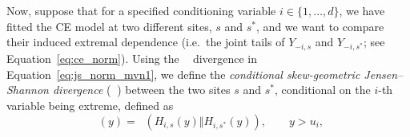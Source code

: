 \documentclass[12pt]{article}
\newcommand{\JSGa}{\mathop{\mathrm{JS}^{\mathrm{G}_{\lambda}}}\nolimits}
\newcommand{\cJSGa}[1]{\mathop{\mathrm{cJS}_{i, #1}^{\mathrm{G}_{\lambda}}}\nolimits}
\begin{document}
Now, suppose that for a specified conditioning variable $i \in \{1, \ldots, d\}$, we have fitted the CE model at two different sites, $s$ and $s^*$, and we want to compare their induced extremal dependence (i.e.\ the joint tails of $Y_{-i, s}$ and $Y_{-i, s^*}$; see Equation~\eqref{eq:ce_norm}). 
Using the $\JSGa{}$ divergence in Equation~\eqref{eq:js_norm_mvn1}, we define the \textit{conditional skew-geometric Jensen--Shannon divergence} ($\cJSGa{s, s^*}$) between the two sites $s$ and $s^*$, conditional on the $i$-th variable being extreme, defined as
\begin{equation} \label{eq:cjsga}
  \cJSGa{s, s^*}(y) = \JSGa{}\left(H_{i, s}(y) \Vert H_{i, s^*}(y)\right),\qquad y > u_i,
\end{equation}
\end{document}
